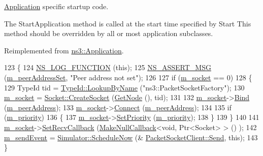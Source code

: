 \hyperlink{classns3_1_1Application}{Application} specific startup code. 

The Start\+Application method is called at the start time specified by Start This method should be overridden by all or most application subclasses. 

Reimplemented from \hyperlink{classns3_1_1Application_a3405dd01508beacce8ed6e3a20bdf05a}{ns3\+::\+Application}.


\begin{DoxyCode}
123 \{
124   \hyperlink{log-macros-disabled_8h_a90b90d5bad1f39cb1b64923ea94c0761}{NS\_LOG\_FUNCTION} (\textcolor{keyword}{this});
125   \hyperlink{assert_8h_aff5ece9066c74e681e74999856f08539}{NS\_ASSERT\_MSG} (\hyperlink{classns3_1_1PacketSocketClient_ad6674274402bc6506d8fc5c8b0210f92}{m\_peerAddressSet}, \textcolor{stringliteral}{"Peer address not set"});
126 
127   \textcolor{keywordflow}{if} (\hyperlink{classns3_1_1PacketSocketClient_a4eb98581ecf226bdf7d43696b0429306}{m\_socket} == 0)
128     \{
129       TypeId tid = \hyperlink{classns3_1_1TypeId_a119cf99c20931fdc294602cd360b180e}{TypeId::LookupByName} (\textcolor{stringliteral}{"ns3::PacketSocketFactory"});
130       \hyperlink{classns3_1_1PacketSocketClient_a4eb98581ecf226bdf7d43696b0429306}{m\_socket} = \hyperlink{classns3_1_1Socket_ad448a62bb50ad3dbac59c879a885a8d2}{Socket::CreateSocket} (\hyperlink{classns3_1_1Application_a664b15088389bec8e35b35742138f097}{GetNode} (), tid);
131 
132       \hyperlink{classns3_1_1PacketSocketClient_a4eb98581ecf226bdf7d43696b0429306}{m\_socket}->\hyperlink{classns3_1_1Socket_ada93439a43de2028b5a8fc6621dad482}{Bind} (\hyperlink{classns3_1_1PacketSocketClient_af69b407a03a7a42baa902e622b07f6cf}{m\_peerAddress});
133       \hyperlink{classns3_1_1PacketSocketClient_a4eb98581ecf226bdf7d43696b0429306}{m\_socket}->\hyperlink{classns3_1_1Socket_a97f08aaf37b8fd7d4b5cad4dfdd4022a}{Connect} (\hyperlink{classns3_1_1PacketSocketClient_af69b407a03a7a42baa902e622b07f6cf}{m\_peerAddress});
134 
135       \textcolor{keywordflow}{if} (\hyperlink{classns3_1_1PacketSocketClient_aed618e34c7c3b8cedc831b14c6d4129f}{m\_priority})
136         \{
137           \hyperlink{classns3_1_1PacketSocketClient_a4eb98581ecf226bdf7d43696b0429306}{m\_socket}->\hyperlink{classns3_1_1Socket_a904573518e0279618dbcb49f085d0fd6}{SetPriority} (\hyperlink{classns3_1_1PacketSocketClient_aed618e34c7c3b8cedc831b14c6d4129f}{m\_priority});
138         \}
139     \}
140 
141   \hyperlink{classns3_1_1PacketSocketClient_a4eb98581ecf226bdf7d43696b0429306}{m\_socket}->\hyperlink{classns3_1_1Socket_a243f7835ef1a85f9270fd3577e3a40da}{SetRecvCallback} (\hyperlink{group__makenullcallback_ga7e3cd6816f63ea9112c04b0086c2c65a}{MakeNullCallback}<\textcolor{keywordtype}{void}, Ptr<Socket> > ()
      );
142   \hyperlink{classns3_1_1PacketSocketClient_a6f213865e8780152a1cc67d41be69923}{m\_sendEvent} = \hyperlink{classns3_1_1Simulator_a2219ee02c0647adc83d1c918c3256266}{Simulator::ScheduleNow} (&
      \hyperlink{classns3_1_1PacketSocketClient_ad3a4b71574d311bbc927ec46dc52abd0}{PacketSocketClient::Send}, \textcolor{keyword}{this});
143 \}
\end{DoxyCode}


